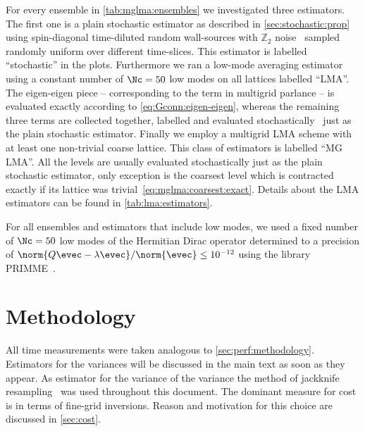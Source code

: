 For every ensemble in \cref{tab:mglma:ensembles} we investigated three estimators.
The first one is a plain stochastic estimator as described in \cref{sec:stochastic:prop} using spin-diagonal time-diluted random wall-sources with $\mathbb{Z}_2$ noise~\cite{ETM:2008zte} sampled randomly uniform over different time-slices.
This estimator is labelled ``stochastic'' in the plots.
Furthermore we ran a low-mode averaging estimator using a constant number of $\Nc=50$ low modes on all lattices labelled ``LMA''.
The eigen-eigen piece -- corresponding to the  term in multigrid parlance -- is evaluated exactly according to \cref{eq:Gconn:eigen-eigen}, whereas the remaining three terms are collected together, labelled  and evaluated stochastically~\cite{lynch2023} just as the plain stochastic estimator.
Finally we employ a multigrid LMA scheme with at least one non-trivial coarse lattice.
This class of estimators is labelled ``MG LMA''.
All the levels are usually evaluated stochastically just as the plain stochastic estimator, only exception is the coarsest level which is contracted exactly if its lattice was trivial~\cref{eq:mglma:coarsest:exact}.
Details about the LMA estimators can be found in \cref{tab:lma:estimators}.

For all ensembles and estimators that include low modes, we used a fixed number of $\Nc=50$ low modes of the Hermitian Dirac operator determined to a precision of $\norm{Q \evec - \lambda \evec} / \norm{\evec} \leq 10^{-12}$ using the library PRIMME~\cite{primme}.

\section{Methodology}
\label{sec:numerics:methodology}


All time measurements were taken analogous to \cref{sec:perf:methodology}.
Estimators for the variances will be discussed in the main text as soon as they appear.
As estimator for the variance of the variance the method of jackknife resampling~\cite{efron1982jackknife,shao2012jackknife} was used throughout this document.
The dominant measure for cost is in terms of fine-grid inversions.
Reason and motivation for this choice are discussed in \cref{sec:cost}.

